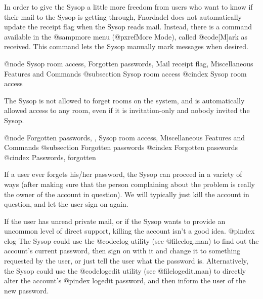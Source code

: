 In order to give the Sysop a little more freedom from users
who want to know if their mail to the Sysop is getting through,
Fnordadel does not automatically update the receipt flag when the
Sysop reads mail.  Instead, there is a command available in the
@samp{more} menu (@pxref{More Mode}), called @code{[M]ark as received}.
This command lets the Sysop manually mark messages when desired.

@node Sysop room access, Forgotten passwords, Mail receipt flag, Miscellaneous Features and Commands
@subsection Sysop room access
@cindex Sysop room access

The Sysop is not allowed to forget rooms on the system, and
is automatically allowed access to any room, even if it is invitation-only
and nobody invited the Sysop.

@node Forgotten passwords,  , Sysop room access, Miscellaneous Features and Commands
@subsection Forgotten passwords
@cindex Forgotten passwords
@cindex Passwords, forgotten

If a user ever forgets his/her password, the Sysop can proceed
in a variety of ways (after making sure that the person complaining
about the problem is really the owner of the account in question).  We
will typically just kill the account in question, and let the user
sign on again.

If the user has unread private mail, or if the Sysop wants to
provide an uncommon level of direct support, killing the account isn't
a good idea.
@pindex clog
The Sysop could use the @code{clog} utility (see @file{clog.man}) to find out
the account's current password, then sign on with it
and change it to something requested by the user, or just tell the
user what the password is.  Alternatively, the Sysop could use the
@code{logedit} utility (see @file{logedit.man}) to directly alter the account's
@pindex logedit
password, and then inform the user of the new password.

